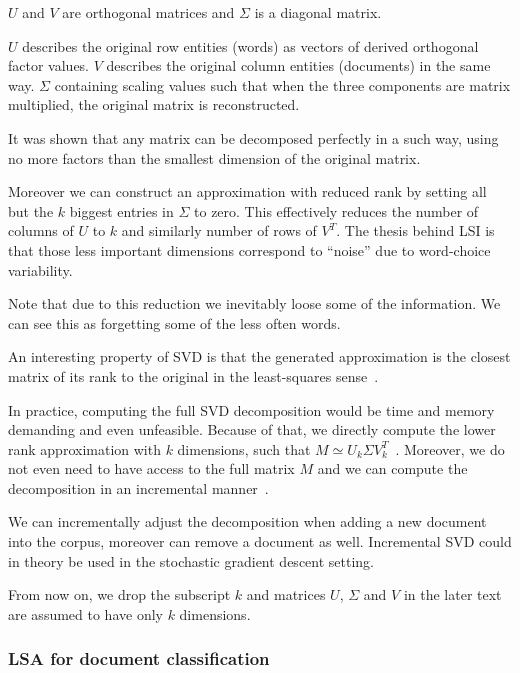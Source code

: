     $U$ and $V$ are orthogonal matrices and $\Sigma$ is a diagonal matrix.
    
    {}

    $U$ describes the original row entities (words) as vectors of derived orthogonal  factor values. 
    $V$ describes the original column entities (documents) in the same way.
    $\Sigma$ containing scaling values such that when the three components are matrix multiplied, the original matrix is reconstructed.

    It was shown that any matrix can be decomposed perfectly in a such way, using no more factors than the smallest dimension of the original matrix.
    
    Moreover we can construct an approximation with reduced rank by setting all but the $k$ biggest entries in $\Sigma$ to zero. 
    This effectively reduces the number of columns of $U$ to $k$ and similarly number of rows of $V^T$.
    The thesis behind LSI is that those less important dimensions correspond to “noise” due to word-choice variability.
    
    Note that due to this reduction we inevitably loose some of the information. 
    We can see this as forgetting some of the less often words.

    An interesting property of SVD is that the generated approximation is the closest matrix of its rank to the original in the least-squares sense~\cite{berry1995using}.

    In practice, computing the full SVD decomposition would be time and memory demanding and even unfeasible.
    Because of that, we directly compute the lower rank approximation with $k$ dimensions,
    such that $M \simeq U_k \Sigma V_k^T$~\cite{halko2011finding}. %
    Moreover, we do not even need to have access to the full matrix $M$ and we can compute the decomposition in an incremental manner~\cite{brand2006fast}. %
    
    We can incrementally adjust the decomposition when adding a new document into the corpus, moreover  can remove a document as well.
    Incremental SVD could in theory be used in the stochastic gradient descent setting.
    
    From now on, we drop the subscript $k$ and matrices $U$, $\Sigma$ and $V$ in the later text are assumed to have only $k$ dimensions.
    
    
    \subsubsection{LSA for document classification}
    
